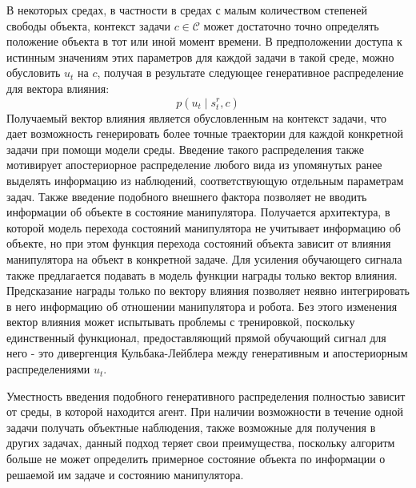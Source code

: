 В некоторых средах, в частности в средах с малым количеством степеней свободы объекта, контекст задачи $c \in \mathcal{C}$ может достаточно точно определять положение объекта в тот или иной момент времени.
В предположении доступа к истинным значениям этих параметров для каждой задачи в такой среде, можно обусловить $u_t$ на $c$, получая в результате следующее генеративное распределение для вектора влияния:
\begin{equation}
    p\left(u_t \mid s^r_t, c\right)
\end{equation}
Получаемый вектор влияния является обусловленным на контекст задачи, что дает возможность генерировать более точные траектории для каждой конкретной задачи при помощи модели среды.
Введение такого распределения также мотивирует апостериорное распределение любого вида из упомянутых ранее выделять информацию из наблюдений, соответствующую отдельным параметрам задач.
Также введение подобного внешнего фактора позволяет не вводить информации об объекте в состояние манипулятора.
Получается архитектура, в которой модель перехода состояний манипулятора не учитывает информацию об объекте, но при этом функция перехода состояний объекта зависит от влияния манипулятора на объект в конкретной задаче.
Для усиления обучающего сигнала также предлагается подавать в модель функции награды только вектор влияния.
Предсказание награды только по вектору влияния позволяет неявно интегрировать в него информацию об отношении манипулятора и робота.
Без этого изменения вектор влияния может испытывать проблемы с тренировкой, поскольку единственный функционал, предоставляющий прямой обучающий сигнал для него - это дивергенция Кульбака-Лейблера между генеративным и апостериорным распределениями $u_t$.

Уместность введения подобного генеративного распределения полностью зависит от среды, в которой находится агент.
При наличии возможности в течение одной задачи получать объектные наблюдения, также возможные для получения в других задачах, данный подход теряет свои преимущества, поскольку алгоритм больше не может определить примерное состояние объекта по информации о решаемой им задаче и состоянию манипулятора.

